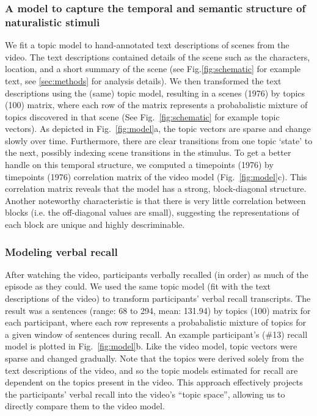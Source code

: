 \documentclass{article}
\begin{document}
{\subsubsection{A model to capture the temporal and semantic structure of naturalistic stimuli}
We fit a topic model \citep{BleiEtal03} to hand-annotated text descriptions of scenes from the video. The text descriptions contained details of the scene such as the characters, location, and a short summary of the scene (see Fig.\ref{fig:schematic} for example text, see \ref{sec:methods} for analysis details). We then transformed the text descriptions using the (same) topic model, resulting in a scenes (1976) by topics (100) matrix, where each row of the matrix represents a probabalistic mixture of topics discovered in that scene (See Fig.~\ref{fig:schematic} for example topic vectors). As depicted in Fig.~\ref{fig:model}a, the topic vectors are sparse and change slowly over time. Furthermore, there are clear transitions from one topic `state' to the next, possibly indexing scene transitions in the stimulus. To get a better handle on this temporal structure, we computed a timepoints (1976) by timepoints (1976) correlation matrix of the video model (Fig.~\ref{fig:model}c).  This correlation matrix reveals that the model has a strong, block-diagonal structure. Another noteworthy characteristic is that there is very little correlation between blocks (i.e. the off-diagonal values are small), suggesting the representations of each block are unique and highly descriminable.

\subsubsection{Modeling verbal recall}
After watching the video, participants verbally recalled (in order) as much of the episode as they could.  We used the same topic model (fit with the text descriptions of the video) to transform participants' verbal recall transcripts. The result was a sentences (range: 68 to 294, mean: 131.94) by topics (100) matrix for each participant, where each row represents a probabalistic mixture of topics for a given window of sentences during recall. An example participant's (\#13) recall model is plotted in Fig.~\ref{fig:model}b. Like the video model, topic vectors were sparse and changed gradually.  Note that the topics were derived solely from the text descriptions of the video, and so the topic models estimated for recall are dependent on the topics present in the video. This approach effectively projects the participants' verbal recall into the video's ``topic space'', allowing us to directly compare them to the video model.

}
\end{document}
